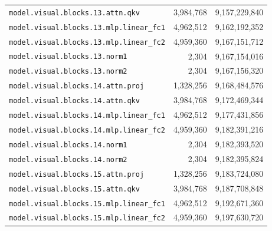 \documentclass[10pt,a4paper]{article}
\theoremstyle{definition}
\begin{document}
\begin{appendices}
\begin{longtable}{p{9.5cm}rr}
\texttt{model.\allowbreak{}visual.\allowbreak{}blocks.\allowbreak{}13.\allowbreak{}attn.\allowbreak{}qkv} & 3,984,768 & 9,157,229,840 \\
\texttt{model.\allowbreak{}visual.\allowbreak{}blocks.\allowbreak{}13.\allowbreak{}mlp.\allowbreak{}linear\_fc1} & 4,962,512 & 9,162,192,352 \\
\texttt{model.\allowbreak{}visual.\allowbreak{}blocks.\allowbreak{}13.\allowbreak{}mlp.\allowbreak{}linear\_fc2} & 4,959,360 & 9,167,151,712 \\
\texttt{model.\allowbreak{}visual.\allowbreak{}blocks.\allowbreak{}13.\allowbreak{}norm1} & 2,304 & 9,167,154,016 \\
\texttt{model.\allowbreak{}visual.\allowbreak{}blocks.\allowbreak{}13.\allowbreak{}norm2} & 2,304 & 9,167,156,320 \\
\texttt{model.\allowbreak{}visual.\allowbreak{}blocks.\allowbreak{}14.\allowbreak{}attn.\allowbreak{}proj} & 1,328,256 & 9,168,484,576 \\
\texttt{model.\allowbreak{}visual.\allowbreak{}blocks.\allowbreak{}14.\allowbreak{}attn.\allowbreak{}qkv} & 3,984,768 & 9,172,469,344 \\
\texttt{model.\allowbreak{}visual.\allowbreak{}blocks.\allowbreak{}14.\allowbreak{}mlp.\allowbreak{}linear\_fc1} & 4,962,512 & 9,177,431,856 \\
\texttt{model.\allowbreak{}visual.\allowbreak{}blocks.\allowbreak{}14.\allowbreak{}mlp.\allowbreak{}linear\_fc2} & 4,959,360 & 9,182,391,216 \\
\texttt{model.\allowbreak{}visual.\allowbreak{}blocks.\allowbreak{}14.\allowbreak{}norm1} & 2,304 & 9,182,393,520 \\
\texttt{model.\allowbreak{}visual.\allowbreak{}blocks.\allowbreak{}14.\allowbreak{}norm2} & 2,304 & 9,182,395,824 \\
\texttt{model.\allowbreak{}visual.\allowbreak{}blocks.\allowbreak{}15.\allowbreak{}attn.\allowbreak{}proj} & 1,328,256 & 9,183,724,080 \\
\texttt{model.\allowbreak{}visual.\allowbreak{}blocks.\allowbreak{}15.\allowbreak{}attn.\allowbreak{}qkv} & 3,984,768 & 9,187,708,848 \\
\texttt{model.\allowbreak{}visual.\allowbreak{}blocks.\allowbreak{}15.\allowbreak{}mlp.\allowbreak{}linear\_fc1} & 4,962,512 & 9,192,671,360 \\
\texttt{model.\allowbreak{}visual.\allowbreak{}blocks.\allowbreak{}15.\allowbreak{}mlp.\allowbreak{}linear\_fc2} & 4,959,360 & 9,197,630,720 \\

\end{longtable}
\end{appendices}
\end{document}

